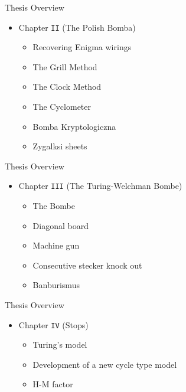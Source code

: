 \documentclass[hyphens,aspectratio=169]{beamer}
\begin{document}
\begin{frame}[fragile]{Thesis Overview}
	\begin{itemize}

		\item Chapter \texttt{II} (The Polish Bomba)
		      \vspace{1em}
		      \begin{itemize}
			      \setlength\itemsep{1em}
			      \item Recovering Enigma wirings
			      \item The Grill Method
			      \item The Clock Method
			      \item The Cyclometer
			      \item Bomba Kryptologiczna
			      \item Zygalksi sheets
		      \end{itemize}
	\end{itemize}

\end{frame}


\begin{frame}[fragile]{Thesis Overview}
	\begin{itemize}
		\item Chapter \texttt{III} (The Turing-Welchman Bombe)
		      \vspace{1em}
		      \begin{itemize}
			      \setlength\itemsep{1em}
			      \item The Bombe
			      \item Diagonal board
			      \item Machine gun
			      \item Consecutive stecker knock out
			      \item Banburismus
		      \end{itemize}
	\end{itemize}

\end{frame}

\begin{frame}[fragile]{Thesis Overview}
	\begin{itemize}
		\item Chapter \texttt{IV} (Stops)
		      \vspace{1em}
		      \begin{itemize}
			      \setlength\itemsep{1em}
			      \item Turing's model
			      \item Development of a new cycle type model
			      \item H-M factor
		      \end{itemize}
	\end{itemize}

\end{frame}
\end{document}
